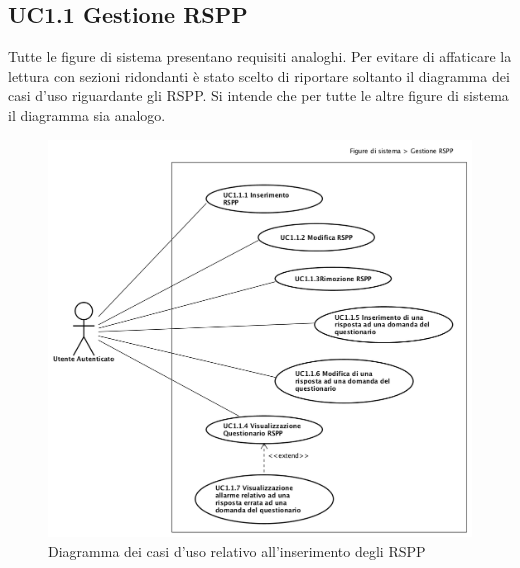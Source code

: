	\subsection{UC1.1 Gestione RSPP}
	\label{section:UC1_1}
	Tutte le figure di sistema presentano requisiti analoghi. Per evitare di affaticare la lettura con sezioni ridondanti è stato scelto di riportare soltanto il diagramma dei casi d'uso riguardante gli RSPP. Si intende che per tutte le altre figure di sistema il diagramma sia analogo. 
		\begin{figure}[H]
			\begin{center}
				\includegraphics[width=14cm]{Pics/UC1_1_FigureDiSistema_RSPP.png}
				\caption{Diagramma dei casi d'uso relativo all'inserimento degli RSPP}
				\label{fig:UC1_1RSPP}
			\end{center}
		\end{figure}
